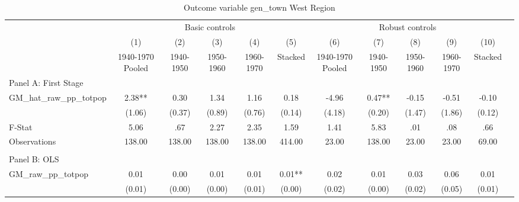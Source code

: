  \begin{table}[htbp]\centering {} \begin{threeparttable} \caption{Outcome variable gen\_town West Region} \begin{tabular}{l*{11}{c}} \toprule
          &\multicolumn{5}{c}{Basic controls}                                   &\multicolumn{5}{c}{Robust controls}                                  \\\cmidrule(lr){2-6}\cmidrule(lr){7-11}
          &\multicolumn{1}{c}{(1)}&\multicolumn{1}{c}{(2)}&\multicolumn{1}{c}{(3)}&\multicolumn{1}{c}{(4)}&\multicolumn{1}{c}{(5)}&\multicolumn{1}{c}{(6)}&\multicolumn{1}{c}{(7)}&\multicolumn{1}{c}{(8)}&\multicolumn{1}{c}{(9)}&\multicolumn{1}{c}{(10)}\\
          &\multicolumn{1}{c}{1940-1970 Pooled}&\multicolumn{1}{c}{1940-1950}&\multicolumn{1}{c}{1950-1960}&\multicolumn{1}{c}{1960-1970}&\multicolumn{1}{c}{Stacked}&\multicolumn{1}{c}{1940-1970 Pooled}&\multicolumn{1}{c}{1940-1950}&\multicolumn{1}{c}{1950-1960}&\multicolumn{1}{c}{1960-1970}&\multicolumn{1}{c}{Stacked}\\
\cmidrule(lr){1-11}
\multicolumn{10}{l}{Panel A: First Stage}\\
\cmidrule(lr){1-11}
GM\_hat\_raw\_pp\_totpop&      2.38** &      0.30   &      1.34   &      1.16   &      0.18   &     -4.96   &      0.47** &     -0.15   &     -0.51   &     -0.10   \\
          &    (1.06)   &    (0.37)   &    (0.89)   &    (0.76)   &    (0.14)   &    (4.18)   &    (0.20)   &    (1.47)   &    (1.86)   &    (0.12)   \\
\midrule
F-Stat    &      5.06   &       .67   &      2.27   &      2.35   &      1.59   &      1.41   &      5.83   &       .01   &       .08   &       .66   \\
Observations&    138.00   &    138.00   &    138.00   &    138.00   &    414.00   &     23.00   &    138.00   &     23.00   &     23.00   &     69.00   \\
\cmidrule[\heavyrulewidth](lr){1-11} \\ \cmidrule[\heavyrulewidth](lr){1-11}
\multicolumn{10}{l}{Panel B: OLS}\\
\cmidrule(lr){1-11}
GM\_raw\_pp\_totpop&      0.01   &      0.00   &      0.01   &      0.01   &      0.01** &      0.02   &      0.01   &      0.03   &      0.06   &      0.01   \\
          &    (0.01)   &    (0.00)   &    (0.00)   &    (0.01)   &    (0.00)   &    (0.02)   &    (0.00)   &    (0.02)   &    (0.05)   &    (0.01)   \\

\end{tabular}
\end{threeparttable}
\end{table}
